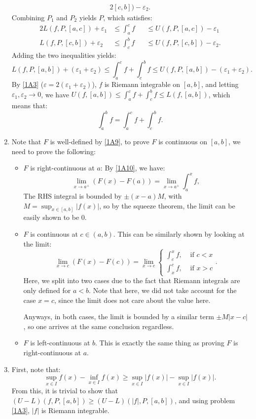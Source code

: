 \begin{enumerate}[label=\textbf{1A.\arabic*}]
\begin{alignat*}{2}
    [c, b]) - \varepsilon_{2}
  .\end{alignat*}
  Combining \( P_{1} \) and \( P_{2} \) yields \( P \), which satisfies:
  \begin{alignat*}{2}
    L(f, P, [a, c]) + \varepsilon_{1} &\le \int _{a}^{c} f &&\le U(f, P,
    [a, c]) - \varepsilon_{1}\\
    L(f, P, [c, b]) + \varepsilon_{2} &\le \int _{c}^{b} f &&\le U(f, P,
    [c, b]) - \varepsilon_{2}
  .\end{alignat*}
  Adding the two inequalities yields:
  \[
    L(f, P, [a, b]) + (\varepsilon_{1} + \varepsilon_{2}) \le \int _{a}^{c} f +
    \int _{c}^{b} f \le U(f, P, [a, b]) -  (\varepsilon_{1} + \varepsilon_{2})
  .\] 
  By \ref{1A3} (\( \varepsilon = 2(\varepsilon_{1} + \varepsilon_{2}) \)), \( f
  \) is Riemann integrable on \( [a, b] \), and letting \( \varepsilon_{1},
  \varepsilon_{2} \to 0 \), we have \( U(f, [a, b]) \le \int _{a}^{c} f +
  \int _{c}^{b} f \le  L(f, [a, b]) \), which means that:
  \[
    \int _{a}^{b} f = \int _{a}^{c} f + \int _{c}^{b} f
  .\] 
\item Note that \( F \) is well-defined by \ref{1A9}, to prove \( F \) is
  continuous on \( [a, b] \), we need to prove the following:
  \begin{itemize}
    \item \( F \) is right-continuous at \( a \): By \ref{1A10}, we have:
      \[
        \lim_{x \to a^{+}} (F(x) - F(a)) = \lim_{x \to a^{+}}  \int _{a}^{x} f
      ,\] 
      The RHS integral is bounded by \( \pm(x - a)M \), with \( M = \sup_{x \in [a,
      b]} |f(x)| \), so by the squeeze theorem, the limit can be easily shown to
      be \( 0 \).
    \item \( F \) is continuous at \( c \in (a, b) \). This can be similarly
      shown by looking at the limit:
      \[
        \lim_{x \to c} (F(x) - F(c)) = \lim_{x \to  c} \begin{cases}
          \int _{c}^{x} f, &\text{ if } c < x\\
          \int _{x}^{c} f, &\text{ if } x > c
        \end{cases}
      .\] 
      Here, we split into two cases due to the fact that Riemann integrals are
      only defined for \( a < b \). Note that here, we did not take account for
      the case \( x = c \), since the limit does not care about the value here.

      Anyways, in both cases, the limit is bounded by a similar term \( \pm M|x
      - c| \), so one arrives at the same conclusion regardless.
    \item \( F \) is left-continuous at \( b \). This is exactly the same thing
      as proving \( F \) is right-continuous at \( a \).
  \end{itemize}
\item First, note that:
  \[
    \sup_{x \in I} f(x) - \inf_{x \in I} f(x) \ge  \sup_{x \in I} |f(x)| -
    \sup_{x \in I} |f(x)|
  .\] 
  From this, it is trivial to show that \( (U - L)(f, P, [a, b]) \ge (U -
  L)(|f|, P, [a, b]) \), and using problem \ref{1A3}, \( |f| \) is Riemann
  integrable.


\end{enumerate}
